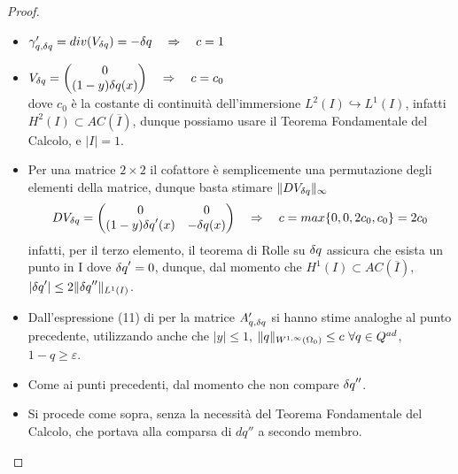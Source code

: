 \begin{proof}
	{\scriptsize\ \\}
	\begin{itemize}
	\item $\gamma'_{q,{\delta q}}=div(V_{\delta q})=-{\delta q}\quad\Rightarrow\quad c=1$
	\item $V_{\delta q}=\begin{pmatrix}0\\(1-y){\delta q}(x)\end{pmatrix} \quad\Rightarrow\quad c=c_0$\\
	dove $c_0$ è la costante di continuità dell'immersione $L^2(I)\hookrightarrow L^1(I)$, infatti $H^2(I)\subset AC(\overline{I})$, dunque possiamo usare il Teorema Fondamentale del Calcolo, e $|I|=1$.
	\item Per una matrice $2\times 2$ il cofattore è semplicemente una permutazione degli elementi della matrice, dunque basta stimare $\|DV_{\delta q}\|_\infty$
$$DV_{\delta q}=\begin{pmatrix}0&0\\(1-y){\delta q}'(x)&-{\delta q}(x)\end{pmatrix}\quad\Rightarrow\quad c=max\{0,0,2c_0,c_0\}=2c_0$$
	infatti, per il terzo elemento, il teorema di Rolle su ${\delta q}$ assicura che esista un punto in I dove ${\delta q}'=0$, dunque, dal momento che $H^1(I)\subset AC(\overline{I})$, $|{\delta q}'|\leq 2\|{\delta q}''\|_{L^1(I)}$.
	\item Dall'espressione (11) di \cite{Kinigera} per la matrice $A'_{q,{\delta q}}$ si hanno stime analoghe al punto precedente, utilizzando anche che $|y|\leq1$, $\|q\|_{W^{1,\infty}({\Omega_0})}\leq c\ \forall q\in Q^{ad}$, $1-q\geq\varepsilon$.
	\item Come ai punti precedenti, dal momento che non compare ${\delta q}''$.
	\item Si procede come sopra, senza la necessità del Teorema Fondamentale del Calcolo, che portava alla comparsa di $dq''$ a secondo membro.
	\end{itemize}
\end{proof}

